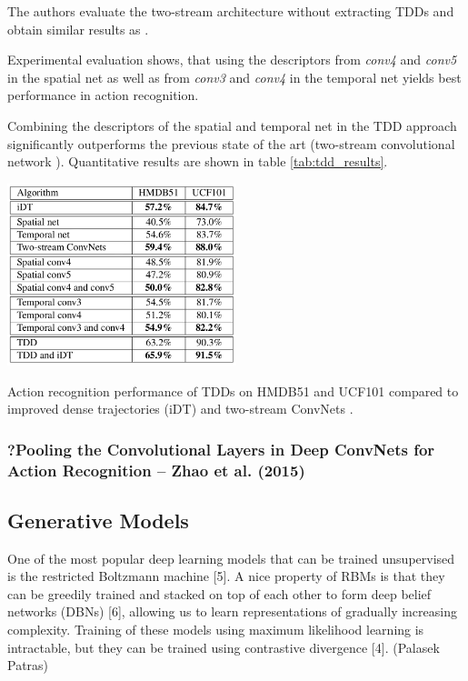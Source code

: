 The authors evaluate the two-stream architecture without extracting TDDs and obtain similar results as \textcite{simonyan_two-stream_2014}.

Experimental evaluation shows, that using the descriptors from \textit{conv4} and \textit{conv5} in the spatial net as well as from \textit{conv3} and \textit{conv4} in the temporal net yields best performance in action recognition.

Combining the descriptors of the spatial and temporal net in the TDD approach significantly outperforms the previous state of the art (two-stream convolutional network \cite{simonyan_two-stream_2014}).
Quantitative results are shown in table \ref{tab:tdd_results}.

\begin{table}[H]
    \centering
    \includegraphics[width=0.5\textwidth]{img_deep/tdd_results}
    \caption{Action recognition performance of TDDs on HMDB51 and UCF101 compared to improved dense trajectories (iDT) \cite{wang_action_2013} and two-stream ConvNets \cite{simonyan_two-stream_2014}. \cite{wang_action_2015}}
    \label{tab:tdd_results}
\end{table}


\subsubsection{?Pooling the Convolutional Layers in Deep ConvNets for Action Recognition -- Zhao et al. (2015)}
\cite{zhao_pooling_2015}


\subsection{Generative Models}

One of the most popular deep learning models that can be trained unsupervised is the restricted Boltzmann machine [5]. A nice property of RBMs is that they can be greedily trained and stacked on top of each other to form deep belief networks (DBNs) [6], allowing us to learn representations of gradually increasing complexity. Training of these models using maximum likelihood learning is intractable, but they can be trained using contrastive divergence [4]. (Palasek Patras)

